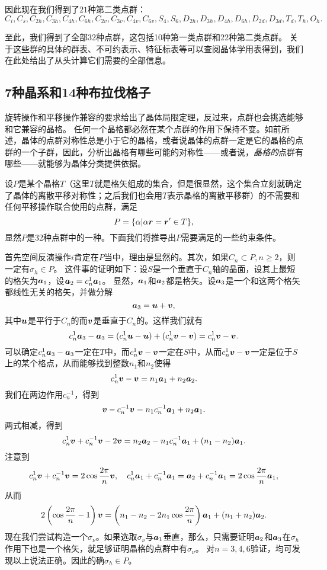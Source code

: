 因此现在我们得到了$21$种第二类点群：
\[
    C_i, C_s, C_{2h}, C_{3h}, C_{4h}, C_{6h}, C_{2v}, C_{3v}, C_{4v}, C_{6v}, S_4, S_6, D_{2h}, D_{3h}, D_{4h}, D_{6h}, D_{2d}, D_{3d}, T_d, T_h, O_h.
\]

至此，我们得到了全部32种点群，这包括10种第一类点群和22种第二类点群。
关于这些群的具体的群表、不可约表示、特征标表等可以查阅晶体学用表得到，我们在此处给出了从头计算它们需要的全部信息。

\subsection{7种晶系和14种布拉伐格子}\label{sec:lattice-group}

旋转操作和平移操作兼容的要求给出了晶体局限定理，反过来，点群也会挑选能够和它兼容的晶格。
任何一个晶格都必然在某个点群的作用下保持不变。如前所述，晶体的点群对称性总是小于它的晶格，或者说晶体的点群一定是它的晶格的点群的一个子群，因此，分析出晶格有哪些可能的对称性——或者说，\emph{晶格的}点群有哪些——就能够为晶体分类提供依据。

设$P$是某个晶格$T$（这里$T$就是格矢组成的集合，但是很显然，这个集合立刻就确定了晶体的离散平移对称性；之后我们也会用$T$表示晶格的离散平移群）的不需要和任何平移操作联合使用的点群，满足
\begin{equation}
    P = \{ \alpha | \alpha \vb*{r} = \vb*{r}' \in T \},
\end{equation}
显然$P$是32种点群中的一种。下面我们将推导出$P$需要满足的一些约束条件。

首先空间反演操作$i$肯定在$P$当中，理由是显然的。其次，如果$C_n \subset P, n \geq 2$，则一定有$\sigma_h \in P$。
这件事的证明如下：设$S$是一个垂直于$C_n$轴的晶面，设其上最短的格矢为$\vb*{a}_1$，设$\vb*{a}_2 = c_n^1 \vb*{a}_1$。
显然，$\vb*{a}_1$和$\vb*{a}_2$都是格矢。设$\vb*{a}_3$是一个和这两个格矢都线性无关的格矢，并做分解
\[
    \vb*{a}_3 = \vb*{u} + \vb*{v},
\]
其中$\vb*{u}$是平行于$C_n$的而$\vb*{v}$是垂直于$C_n$的。这样我们就有
\[
    c_n^1 \vb*{a}_3 - \vb*{a}_3 = (c_n^1 \vb*{u} - \vb*{u}) + (c_n^1 \vb*{v} - \vb*{v}) = c_n^1 \vb*{v} - \vb*{v} .
\]
可以确定$c_n^1 \vb*{a}_3 - \vb*{a}_3$一定在$T$中，而$c_n^1 \vb*{v} - \vb*{v}$一定在$S$中，从而$c_n^1 \vb*{v} - \vb*{v}$一定是位于$S$上的某个格点，从而能够找到整数$n_1$和$n_2$使得
\[
    c_n^1 \vb*{v} - \vb*{v} = n_1 \vb*{a}_1 + n_2 \vb*{a}_2.
\]
我们在两边作用$c_n^{-1}$，得到
\[
    \vb*{v} - c_n^{-1} \vb*{v} = n_1 c_n^{-1} \vb*{a}_1 + n_2 \vb*{a}_1.
\]
两式相减，得到
\[
    c_n^1 \vb*{v} + c_n^{-1} \vb*{v} - 2 \vb*{v} = n_2 \vb*{a}_2 - n_1 c_n^{-1} \vb*{a}_1 + (n_1 - n_2) \vb*{a}_1.
\]
注意到
\[
    c_n^1 \vb*{v} + c_n^{-1} \vb*{v} = 2 \cos\frac{2\pi}{n} \vb*{v}, \quad c_n^1 \vb*{a}_1 + c_n^{-1} \vb*{a}_1 = \vb*{a}_2 + c_n^{-1} \vb*{a}_1 = 2 \cos\frac{2\pi}{n} \vb*{a}_1,
\]
从而
\begin{equation}
    2\left( \cos\frac{2\pi}{n} - 1 \right) \vb*{v} = \left( n_1 - n_2 - 2 n_1 \cos \frac{2\pi}{n} \right) \vb*{a}_1 + (n_1 + n_2) \vb*{a}_2.
\end{equation}
现在我们尝试构造一个$\sigma_\nu$。如果选取$\sigma_\nu$与$\vb*{a}_1$垂直，那么，只需要证明$\vb*{a}_2$和$\vb*{a}_3$在$\sigma_h$作用下也是一个格矢，就足够证明晶格的点群中有$\sigma_\nu$。
对$n=3, 4, 6$验证，均可发现以上说法正确。因此的确$\sigma_h \in P$。

